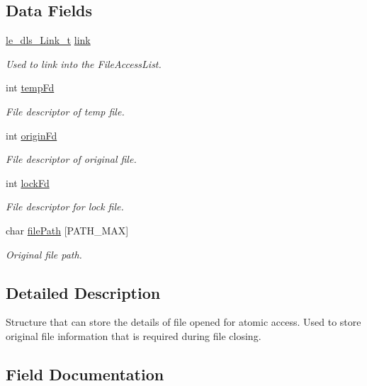 \subsection*{Data Fields}
\begin{DoxyCompactItemize}
\item 
\hyperlink{structle__dls___link__t}{le\+\_\+dls\+\_\+\+Link\+\_\+t} \hyperlink{struct_file_access__t_a5d30735fc24dd9b59585fee7f8a3589c}{link}
\begin{DoxyCompactList}\small\item\em Used to link into the File\+Access\+List. \end{DoxyCompactList}\item 
int \hyperlink{struct_file_access__t_aba117e10361be00bc5b22d3771b25569}{temp\+Fd}
\begin{DoxyCompactList}\small\item\em File descriptor of temp file. \end{DoxyCompactList}\item 
int \hyperlink{struct_file_access__t_ab82577dbadfc8600ad1bf2a6075dfd8b}{origin\+Fd}
\begin{DoxyCompactList}\small\item\em File descriptor of original file. \end{DoxyCompactList}\item 
int \hyperlink{struct_file_access__t_a1b94cf6338efa5664a9415408ccc0fb3}{lock\+Fd}
\begin{DoxyCompactList}\small\item\em File descriptor for lock file. \end{DoxyCompactList}\item 
char \hyperlink{struct_file_access__t_ad36262b41639a0ec683987f2ca5cd3de}{file\+Path} \mbox{[}P\+A\+T\+H\+\_\+\+M\+AX\mbox{]}
\begin{DoxyCompactList}\small\item\em Original file path. \end{DoxyCompactList}\end{DoxyCompactItemize}


\subsection{Detailed Description}
Structure that can store the details of file opened for atomic access. Used to store original file information that is required during file closing. 

\subsection{Field Documentation}
